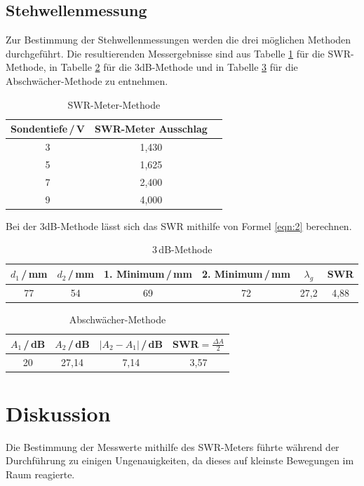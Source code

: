 \subsection{Stehwellenmessung}
Zur Bestimmung der Stehwellenmessungen werden die drei möglichen Methoden durchgeführt.
Die resultierenden Messergebnisse sind aus Tabelle \ref{tab:swr} für die SWR-Methode,
in Tabelle \ref{tab:3dB} für die 3dB-Methode und in Tabelle \ref{tab:abschwächer} für die
Abschwächer-Methode zu entnehmen.
\begin{table}
    \centering
    \begin{tabular}{c c c}
        \toprule
        {Sondentiefe\,/\,V} & {SWR-Meter Ausschlag} \\
        \midrule
         3 & 1,430 \\
         5 & 1,625 \\
         7 & 2,400 \\
         9 & 4,000 \\
        \bottomrule
    \end{tabular}
    \caption{SWR-Meter-Methode}
    \label{tab:swr}
\end{table}
\newline
Bei der 3dB-Methode lässt sich das SWR mithilfe von Formel \ref{eqn:2} berechnen.
\begin{table}
    \centering
    \begin{tabular}{c c c c c c}
        \toprule
        {$d_1$\,/\,mm} & {$d_2$\,/\,mm} & {1. Minimum\,/\,mm} & {2. Minimum\,/\,mm} & {$\lambda_g$} & {SWR}\\
        \midrule
         77 & 54 & 69 & 72 & 27,2 & 4,88 \\
        \bottomrule
    \end{tabular}
    \caption{3\,dB-Methode}
    \label{tab:3dB}
\end{table}
\begin{table}
    \centering
    \begin{tabular}{c c c c}
        \toprule
        {$A_1$\,/\,dB} & {$A_2$\,/\,dB} & {$|A_2-A_1|$\,/\,dB} & {SWR$=\frac{\Delta A}{2}$} \\
        \midrule
        20 & 27,14 & 7,14 & 3,57 \\
        \bottomrule
    \end{tabular}
    \caption{Abschwächer-Methode}
    \label{tab:abschwächer}
\end{table}

\section{Diskussion}
Die Bestimmung der Messwerte mithilfe des SWR-Meters führte während der Durchführung
zu einigen Ungenauigkeiten, da dieses auf kleinste Bewegungen im Raum reagierte.


